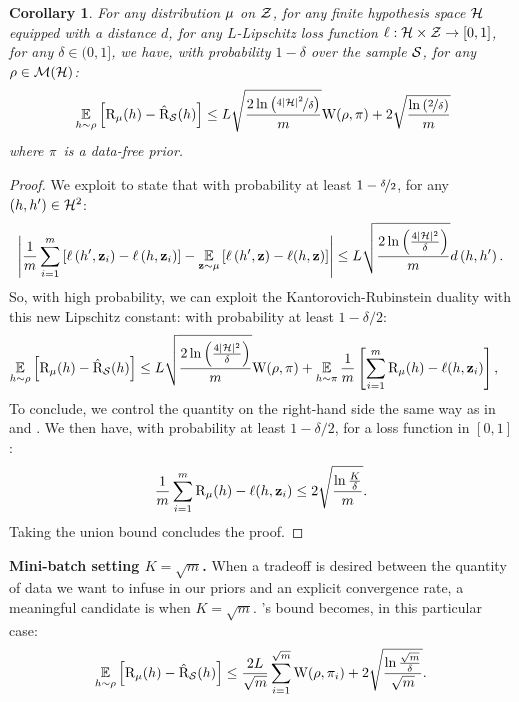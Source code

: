 \documentclass{article}
\newtheorem{corollary}[definition]{Corollary}
\begin{document}
\begin{corollary}
For any distribution $\D$ on $\Z$, for any finite hypothesis space $\H$ equipped with a distance $d$, for any $L$-Lipschitz loss function $\loss: \H\times\Z\to[0,1]$, for any $\delta\in(0,1]$, we have, with probability $1-\delta$ over the sample $\S$, for any $\Q\in\Mcal(\H)$:
\begin{align*}
\ \EE_{h\sim\Q}\Big[ \Risk_{\D}(h) - \Riskhat_{\S}(h) \Big] \le L\sqrt{\frac{2\ln\left(\nicefrac{4|\H|^2}{\delta}\right)}{m}} \W(\Q, \P) +  2\sqrt{\frac{\ln\left(\nicefrac{2}{\delta}\right)}{m}} 
 \end{align*}
where $\P$ is a data-free prior.
\end{corollary}
\begin{proof}
    We exploit \cite[][Equation 35]{amit2022integral} to state that with probability at least $1-\nicefrac{\delta}{2}$, for any $(h,h')\in \H^2$: 
    \[\left|\frac{1}{m} \sum_{i=1}^m\left[\loss\left(h^{\prime}, \z_i\right)-\loss\left(h, \z_i\right)\right]-\EE_{\z \sim \D}\left[\loss\left(h^{\prime}, \z\right)-\loss(h, \z)\right]\right| \leq  L \sqrt{\frac{2 \ln \left(\frac{4|\H|^2}{\delta}\right)}{m}}d\left(h, h^{\prime}\right) .\]
So, with high probability, we can exploit the Kantorovich-Rubinstein duality with this new Lipschitz constant: with probability at least $1-\delta/2$:
\begin{align*}
    \EE_{h\sim\Q}\Big[ \Risk_{\D}(h) - \Riskhat_{\S}(h) \Big] & \le L \sqrt{\frac{2 \ln \left(\frac{4|\H|^2}{\delta}\right)}{m}}\W(\Q, \P) +\EE_{h\sim\P} \frac{1}{m}\LB  \sum_{i=1}^m \Risk_{\D}(h) -\loss(h, \z_i) \RB,
\end{align*}
To conclude, we control the quantity on the right-hand side the same way as in  and . We then have, with probability at least $1-\delta/2$, for a loss function in $[0,1]$:
\[\frac{1}{m} \sum_{i=1}^m \Risk_{\D}(h) -\loss(h, \z_i) \leq 2\sqrt{\frac{\ln\frac{K}{\delta}}{m}}.\]
Taking the union bound concludes the proof.
\end{proof}

\textbf{Mini-batch setting $K=\sqrt{m}$.} When a tradeoff is desired between the quantity of data we want to infuse in our priors and an explicit convergence rate, a meaningful candidate is when $K=\sqrt{m}$.  's bound becomes, in this particular case:
\begin{align}
\label{eq:supervised-with-tuned-K}
 \EE_{h\sim\Q}\Big[ \Risk_{\D}(h) - \Riskhat_{\S}(h) \Big] \le \frac{2L}{\sqrt{m}}\sum_{i=1}^{\sqrt{m}}\W(\Q, \P_i) + 2\sqrt{\frac{\ln\frac{\sqrt{m}}{\delta}}{\sqrt{m}}}.
\end{align}
\end{document}
